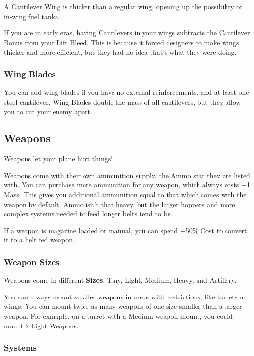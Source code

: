 \documentclass{article}
\begin{document}
A Cantilever Wing is thicker than a regular wing, opening up the
possibility of in-wing fuel tanks.

If you are in early eras, having Cantilevers in your wings
subtracts the Cantilever Bonus from your Lift Bleed. This is because it
forced designers to make wings thicker and more efficient, but they had
no idea that's what they were doing.

\subsubsection{Wing Blades}
\label{_Wing Blades}

You can add wing blades if you have no external reinforcements, and at
least one steel cantilever. Wing Blades double the mass of all
cantilevers, but they allow you to cut your enemy apart.

\subsection{Weapons}
\label{_Weapons}

Weapons let your plane hurt things!

Weapons come with their own ammunition supply, the Ammo stat they are
listed with. You can purchase more ammunition for any weapon, which
always costs +1 Mass. This gives you additional ammunition equal to that
which comes with the weapon by default. Ammo isn't that heavy, but the
larger hoppers and more complex systems needed to feed longer belts tend
to be.

If a weapon is magazine loaded or manual, you can spend +50\% Cost to
convert it to a belt fed weapon.

\subsubsection{Weapon Sizes}
\label{_Weapon Sizes}

Weapons come in different \textbf{Sizes}: Tiny, Light, Medium, Heavy,
and Artillery.

You can always mount smaller weapons in areas with restrictions, like
turrets or wings. You can mount twice as many weapons of one size
smaller than a larger weapon. For example, on a turret with a Medium
weapon mount, you could mount 2 Light Weapons.

\subsubsection{Systems}
\label{_Systems}
\end{document}
